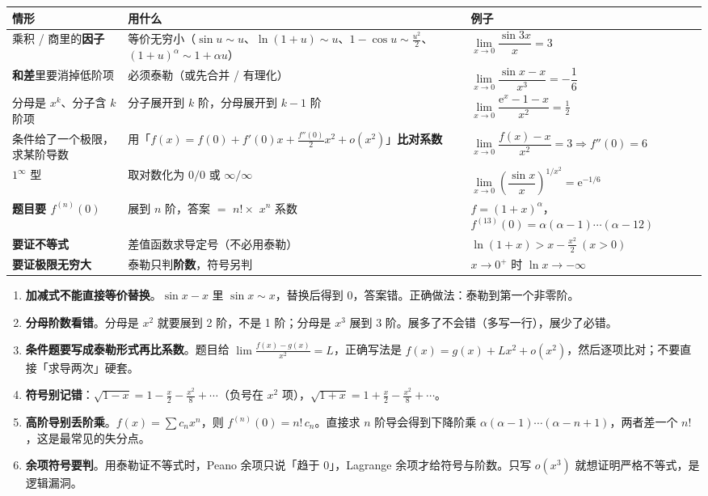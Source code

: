 \documentclass[11pt,a4paper]{ctexart}
\newcommand{\ee}{\mathrm{e}}
\begin{document}
\begin{center}
\footnotesize
\renewcommand{\arraystretch}{1.35}
\begin{tabularx}{\textwidth}{@{}>{\raggedright\arraybackslash}p{3.6cm} >{\raggedright\arraybackslash}p{5.0cm} X@{}}
\toprule
\textbf{情形} & \textbf{用什么} & \textbf{例子}\\
\midrule
乘积 / 商里的\textbf{因子} & 等价无穷小（$\sin u\sim u$、$\ln(1+u)\sim u$、$1-\cos u\sim\frac{u^{2}}2$、$(1+u)^\alpha\sim1+\alpha u$） &
$\lim\limits_{x\to0}\dfrac{\sin 3x}{x}=3$\\
\textbf{和差}里要消掉低阶项 & 必须泰勒（或先合并 / 有理化） &
$\lim\limits_{x\to0}\dfrac{\sin x-x}{x^{3}}=-\dfrac16$\\
分母是 $x^{k}$、分子含 $k$ 阶项 & 分子展开到 $k$ 阶，分母展开到 $k-1$ 阶 &
$\lim\limits_{x\to0}\dfrac{\ee^{x}-1-x}{x^{2}}=\frac12$\\
条件给了一个极限，求某阶导数 & 用「$f(x)=f(0)+f'(0)x+\frac{f''(0)}{2}x^{2}+o(x^{2})$」\textbf{比对系数} &
$\lim\limits_{x\to0}\dfrac{f(x)-x}{x^{2}}=3\Rightarrow f''(0)=6$\\
$1^\infty$ 型 & 取对数化为 $0/0$ 或 $\infty/\infty$ &
$\lim\limits_{x\to0}\left(\dfrac{\sin x}{x}\right)^{1/x^{2}}=\ee^{-1/6}$\\
\textbf{题目要 $f^{(n)}(0)$} & 展到 $n$ 阶，答案 $=$ $n!\times$ $x^{n}$ 系数 &
$f=(1+x)^{\alpha}$，$f^{(13)}(0)=\alpha(\alpha-1)\cdots(\alpha-12)$\\
\textbf{要证不等式} & 差值函数求导定号（不必用泰勒） &
$\ln(1+x)>x-\frac{x^{2}}2\ (x>0)$\\
\textbf{要证极限无穷大} & 泰勒只判\textbf{阶数}，符号另判 &
$x\to0^{+}$ 时 $\ln x\to-\infty$\\
\bottomrule
\end{tabularx}
\end{center}

\begin{warnbox}[六个高频坑]
\begin{enumerate}[label=(\alph*)]
  \item \textbf{加减式不能直接等价替换}。$\sin x - x$ 里 $\sin x\sim x$，替换后得到 $0$，答案错。正确做法：泰勒到第一个非零阶。
  \item \textbf{分母阶数看错}。分母是 $x^{2}$ 就要展到 2 阶，不是 1 阶；分母是 $x^{3}$ 展到 3 阶。展多了不会错（多写一行），展少了必错。
  \item \textbf{条件题要写成泰勒形式再比系数}。题目给 $\lim\frac{f(x)-g(x)}{x^{2}}=L$，正确写法是 $f(x)=g(x)+Lx^{2}+o(x^{2})$，然后逐项比对；不要直接「求导两次」硬套。
  \item \textbf{符号别记错}：$\sqrt{1-x}=1-\frac{x}{2}-\frac{x^{2}}{8}+\cdots$（负号在 $x^{2}$ 项），$\sqrt{1+x}=1+\frac{x}{2}-\frac{x^{2}}{8}+\cdots$。
  \item \textbf{高阶导别丢阶乘}。$f(x)=\sum c_{n}x^{n}$，则 $f^{(n)}(0)=n!\,c_{n}$。直接求 $n$ 阶导会得到下降阶乘 $\alpha(\alpha-1)\cdots(\alpha-n+1)$，两者差一个 $n!$，这是最常见的失分点。
  \item \textbf{余项符号要判}。用泰勒证不等式时，Peano 余项只说「趋于 0」，Lagrange 余项才给符号与阶数。只写 $o(x^{3})$ 就想证明严格不等式，是逻辑漏洞。
\end{enumerate}
\end{warnbox}
\end{document}

